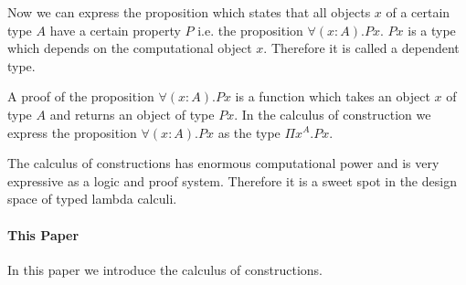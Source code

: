 \begin{enumerate}
    Now we can express the proposition which states that all objects $x$ of
    a certain type $A$ have a certain property $P$ i.e. the proposition
    $\forall (x:A). P x$. $P x$ is a type which depends on the computational
    object $x$.  Therefore it is called a dependent type.

    A proof of the proposition $\forall (x: A). P x$ is a function which
    takes an object $x$ of type $A$ and returns an object of type $P x$. In
    the calculus of construction we express the proposition $\forall (x: A).
    P x$ as the type $\Pi x^A. P x$.
\end{enumerate}


The calculus of constructions has enormous computational power and is very
expressive as a logic and proof system. Therefore it is a sweet spot in the
design space of typed lambda calculi.



\paragraph{This Paper}
%
In this paper we introduce the calculus of constructions.

